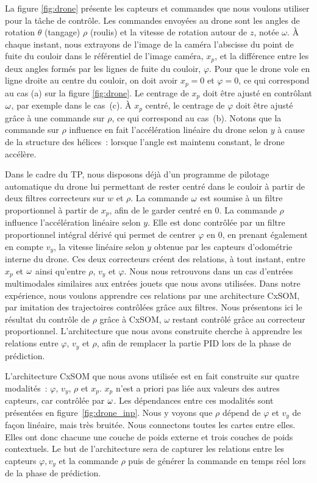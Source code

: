 \documentclass[../main]{subfiles}
\begin{document}
La figure \ref{fig:drone} présente les capteurs et commandes que nous voulons utiliser pour la tâche de contrôle.
Les commandes envoyées au drone sont les angles de rotation $\theta$ (tangage) $\rho$ (roulis) et la vitesse de rotation autour de $z$, notée $\omega$. 
\`A chaque instant, nous extrayons de l'image de la caméra l'abscisse du point de fuite du couloir dans le référentiel de l'image caméra, $x_p$, et la différence entre les deux angles formés par les lignes de fuite du couloir, $\varphi$.
Pour que le drone vole en ligne droite au centre du couloir, on doit avoir $x_p = 0$ et $\varphi = 0$, ce qui correspond au cas (a) sur la figure \ref{fig:drone}.
Le centrage de $x_p$ doit être ajusté en contrôlant $\omega$, par exemple dans le cas~(c).
\`A $x_p$ centré, le centrage de $\varphi$ doit être ajusté grâce à une commande sur $\rho$, ce qui correspond au cas~(b). Notons que la commande sur $\rho$ influence en fait l'accélération linéaire du drone selon $y$ à cause de la structure des hélices~: lorsque l'angle est maintenu constant, le drone accélère.


Dans le cadre du TP, nous  disposons déjà d'un programme de pilotage automatique du drone lui permettant de rester centré dans le couloir à partir de deux filtres correcteurs sur $w$ et $\rho$.
La commande $\omega$ est soumise à un filtre proportionnel à partir de $x_p$, afin de le garder centré en 0.
La commande $\rho$ influence l'accélération linéaire selon $y$.
Elle est donc contrôlée par un filtre proportionnel intégral dérivé qui permet de centrer $\varphi$ en 0, en prenant également en compte $v_y$, la vitesse linéaire selon $y$ obtenue par les capteurs d'odométrie interne du drone.
Ces deux correcteurs créent des relations, à tout instant, entre $x_p$ et $\omega$ ainsi qu'entre $\rho$, $v_y$ et $\varphi$.
Nous nous retrouvons dans un cas d'entrées multimodales similaires aux entrées jouets que nous avons utilisées.
Dans notre expérience, nous voulons apprendre ces relations par une architecture CxSOM, par imitation des trajectoires contrôlées grâce aux filtres.
Nous présentons ici le résultat du contrôle de $\rho$ grâce à CxSOM, $\omega$ restant contrôlé grâce au correcteur proportionnel. L'architecture que nous avons construite cherche à apprendre les relations entre $\varphi$, $v_y$ et $\rho$, afin de remplacer la partie PID lors de la phase de prédiction. 

L'architecture CxSOM que nous avons utilisée est en fait construite sur quatre modalités~: $\varphi$, $v_y$, $\rho$ et $x_p$.
$x_p$ n'est a priori pas liée aux valeurs des autres capteurs, car contrôlée par $\omega$.
Les dépendances entre ces modalités sont présentées en figure~\ref{fig:drone_inp}. Nous y voyons que $\rho$ dépend de $\varphi$ et $v_y$ de façon linéaire, mais très bruitée.
Nous connectons toutes les cartes entre elles.
 Elles ont donc chacune une couche de poids externe et trois couches de poids contextuels. Le but de l'architecture sera de capturer les relations entre les capteurs $\varphi, v_y$ et la commande $\rho$ puis de générer la commande en temps réel lors de la phase de prédiction. 
\end{document}
